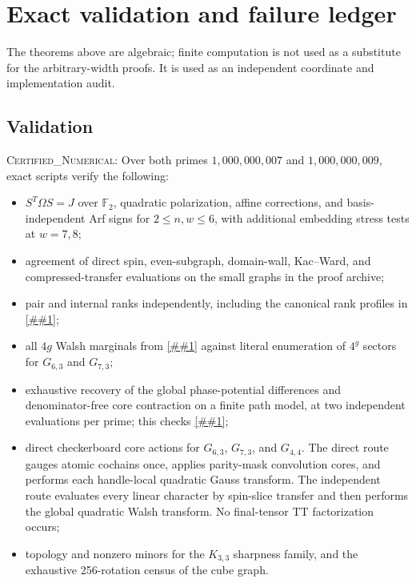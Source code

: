 \documentclass[11pt]{article}
\newcommand{\cref}[1]{\autoref{##1}}%
\newcommand{\Ftwo}{\mathbb F_2}
\newcommand{\claimtag}[1]{\textsc{#1}}
\newcommand{\certified}{\claimtag{Certified\_Numerical}}
\begin{document}
\section{Exact validation and failure ledger}

The theorems above are algebraic; finite computation is not used as a
substitute for the arbitrary-width proofs.  It is used as an independent
coordinate and implementation audit.

\subsection{Validation}

\certified: Over both primes \(1{,}000{,}000{,}007\) and
\(1{,}000{,}000{,}009\), exact scripts verify the following:

\begin{itemize}
\item \(S^T\Omega S=J\) over \(\Ftwo\), quadratic polarization, affine
  corrections, and basis-independent Arf signs for \(2\leq n,w\leq6\), with
  additional embedding stress tests at \(w=7,8\);
\item agreement of direct spin, even-subgraph, domain-wall, Kac--Ward, and
  compressed-transfer evaluations on the small graphs in the proof archive;
\item pair and internal ranks independently, including the canonical
  rank profiles in \cref{tab:ranks};
\item all \(4g\) Walsh marginals from \cref{eq:marginal-contract} against
  literal enumeration of \(4^g\) sectors for \(G_{6,3}\) and \(G_{7,3}\);
\item exhaustive recovery of the global phase-potential differences and
  denominator-free core contraction on a finite path model, at two
  independent evaluations per prime; this checks
  \cref{lem:phase-telescoping};
\item direct checkerboard core actions for \(G_{6,3}\), \(G_{7,3}\), and
  \(G_{4,4}\).  The direct route gauges atomic cochains once, applies
  parity-mask convolution cores, and performs each handle-local quadratic
  Gauss transform.  The independent route evaluates every linear character
  by spin-slice transfer and then performs the global quadratic Walsh
  transform.  No final-tensor TT factorization occurs;
\item topology and nonzero minors for the \(K_{3,3}\) sharpness family, and
  the exhaustive 256-rotation census of the cube graph.
\end{itemize}
\end{document}

